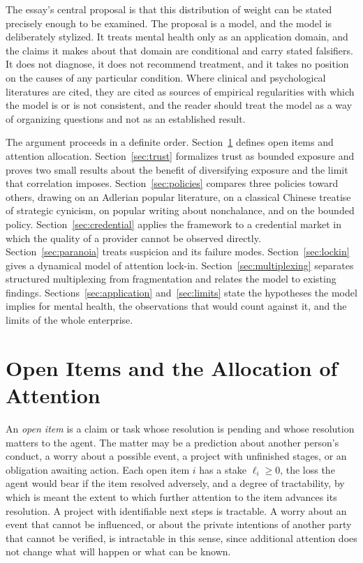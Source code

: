 \documentclass[11pt]{article}
\theoremstyle{definition}
\begin{document}
The essay's central proposal is that this distribution of weight can be stated precisely enough to be examined. The proposal is a model, and the model is deliberately stylized. It treats mental health only as an application domain, and the claims it makes about that domain are conditional and carry stated falsifiers. It does not diagnose, it does not recommend treatment, and it takes no position on the causes of any particular condition. Where clinical and psychological literatures are cited, they are cited as sources of empirical regularities with which the model is or is not consistent, and the reader should treat the model as a way of organizing questions and not as an established result.

The argument proceeds in a definite order. Section~\ref{sec:items} defines open items and attention allocation. Section~\ref{sec:trust} formalizes trust as bounded exposure and proves two small results about the benefit of diversifying exposure and the limit that correlation imposes. Section~\ref{sec:policies} compares three policies toward others, drawing on an Adlerian popular literature, on a classical Chinese treatise of strategic cynicism, on popular writing about nonchalance, and on the bounded policy. Section~\ref{sec:credential} applies the framework to a credential market in which the quality of a provider cannot be observed directly. Section~\ref{sec:paranoia} treats suspicion and its failure modes. Section~\ref{sec:lockin} gives a dynamical model of attention lock-in. Section~\ref{sec:multiplexing} separates structured multiplexing from fragmentation and relates the model to existing findings. Sections~\ref{sec:application} and~\ref{sec:limits} state the hypotheses the model implies for mental health, the observations that would count against it, and the limits of the whole enterprise.

\section{Open Items and the Allocation of Attention}
\label{sec:items}

An \emph{open item} is a claim or task whose resolution is pending and whose resolution matters to the agent. The matter may be a prediction about another person's conduct, a worry about a possible event, a project with unfinished stages, or an obligation awaiting action. Each open item $i$ has a stake $\ell_i\ge 0$, the loss the agent would bear if the item resolved adversely, and a degree of tractability, by which is meant the extent to which further attention to the item advances its resolution. A project with identifiable next steps is tractable. A worry about an event that cannot be influenced, or about the private intentions of another party that cannot be verified, is intractable in this sense, since additional attention does not change what will happen or what can be known.
\end{document}
